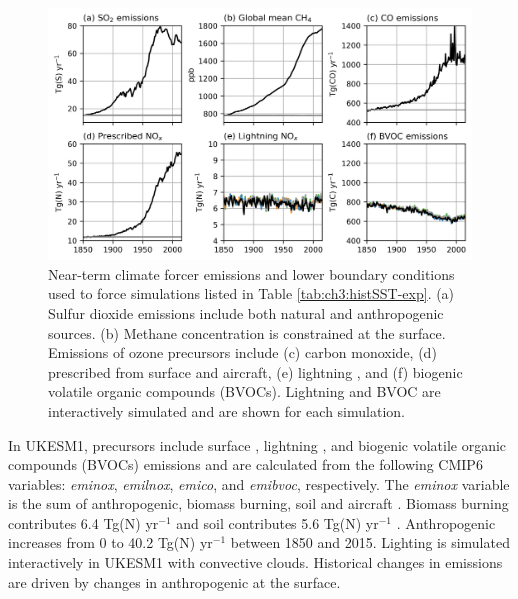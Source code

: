 \begin{figure}
    \centering
    \includegraphics[width=\linewidth]{Chapter3/Figs/f01_emissions.png}
    \caption[Near-term climate forcer emissions and lower boundary conditions used to force AerChemMIP histSST simulations]{Near-term climate forcer emissions and lower boundary conditions used to force simulations listed in Table \ref{tab:ch3:histSST-exp}. (a) Sulfur dioxide emissions include both natural and anthropogenic sources. (b) Methane concentration is constrained at the surface. Emissions of ozone precursors include (c) carbon monoxide, (d) prescribed  from surface and aircraft, (e) lightning , and (f) biogenic volatile organic compounds (BVOCs). Lightning   and BVOC are interactively simulated and are shown for each simulation.}
    \label{fig:ch3:emissions}
\end{figure}

In UKESM1,  precursors include surface , lightning ,  and biogenic volatile organic compounds (BVOCs) emissions and are calculated from the following CMIP6 variables: \textit{eminox}, \textit{emilnox}, \textit{emico}, and \textit{emibvoc}, respectively. The \textit{eminox} variable is the sum of anthropogenic, biomass burning, soil and aircraft . Biomass burning contributes 6.4 Tg(N) yr$^{-1}$ and soil contributes 5.6 Tg(N) yr$^{-1}$ \citep{archibaldDescriptionEvaluationUKCA2020}. Anthropogenic  increases from 0 to 40.2 Tg(N) yr$^{-1}$ between 1850 and 2015. Lighting  is simulated interactively in UKESM1 with convective clouds. Historical changes in  emissions are driven by changes in anthropogenic  at the surface. 

